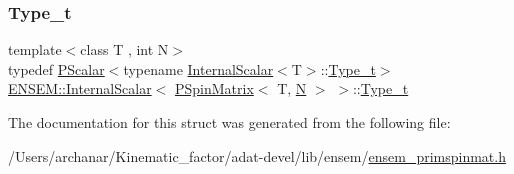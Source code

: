 \mbox{\label{structENSEM_1_1InternalScalar_3_01PSpinMatrix_3_01T_00_01N_01_4_01_4_acfe33659fffa5fb364eb7d27a1fda7db}} 
\subsubsection{\texorpdfstring{Type\_t}{Type\_t}\hspace{0.1cm}{\footnotesize\ttfamily [3/3]}}
{\footnotesize\ttfamily template$<$class T , int N$>$ \\
typedef \mbox{\hyperlink{classENSEM_1_1PScalar}{P\+Scalar}}$<$typename \mbox{\hyperlink{structENSEM_1_1InternalScalar}{Internal\+Scalar}}$<$T$>$\+::\mbox{\hyperlink{structENSEM_1_1InternalScalar_3_01PSpinMatrix_3_01T_00_01N_01_4_01_4_acfe33659fffa5fb364eb7d27a1fda7db}{Type\+\_\+t}}$>$ \mbox{\hyperlink{structENSEM_1_1InternalScalar}{E\+N\+S\+E\+M\+::\+Internal\+Scalar}}$<$ \mbox{\hyperlink{classENSEM_1_1PSpinMatrix}{P\+Spin\+Matrix}}$<$ T, \mbox{\hyperlink{adat__devel_2lib_2hadron_2operator__name__util_8cc_a7722c8ecbb62d99aee7ce68b1752f337}{N}} $>$ $>$\+::\mbox{\hyperlink{structENSEM_1_1InternalScalar_3_01PSpinMatrix_3_01T_00_01N_01_4_01_4_acfe33659fffa5fb364eb7d27a1fda7db}{Type\+\_\+t}}}



The documentation for this struct was generated from the following file\+:\begin{DoxyCompactItemize}
\item 
/\+Users/archanar/\+Kinematic\+\_\+factor/adat-\/devel/lib/ensem/\mbox{\hyperlink{adat-devel_2lib_2ensem_2ensem__primspinmat_8h}{ensem\+\_\+primspinmat.\+h}}\end{DoxyCompactItemize}
